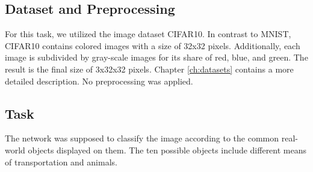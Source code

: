 \subsection*{Dataset and Preprocessing}
For this task, we utilized the image dataset CIFAR10. 
In contrast to MNIST, CIFAR10 contains colored images with a size of 32x32 pixels. Additionally, each image is subdivided by gray-scale images for its share of red, blue, and green. The result is the final size of 3x32x32 pixels. Chapter \ref{ch:datasets} contains a more detailed description.
No preprocessing was applied.
\subsection*{Task}
The network was supposed to classify the image according to the common real-world objects displayed on them. The ten possible objects include different means of transportation and animals. 
